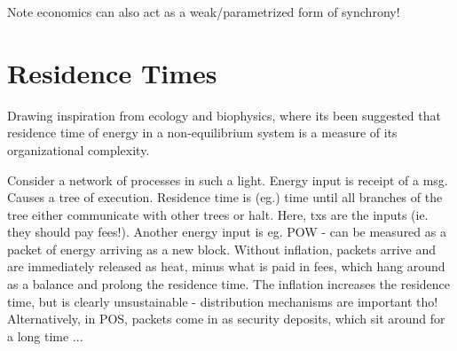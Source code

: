 Note economics can also act as a weak/parametrized form of synchrony!

\section{Residence Times}
Drawing inspiration from ecology and biophysics, 
where its been suggested that residence time of energy in a non-equilibrium system is a 
measure of its organizational complexity.

Consider a network of processes in such a light.
Energy input is receipt of a msg. 
Causes a tree of execution. 
Residence time is (eg.) time until all branches of the tree either communicate with other trees or halt.
Here, txs are the inputs (ie. they should pay fees!).
Another energy input is eg. POW - can be measured as a packet of energy arriving as a new block.
Without inflation, packets arrive and are immediately released as heat, minus what is paid in fees,
which hang around as a balance and prolong the residence time.
The inflation increases the residence time, but is clearly unsustainable - distribution mechanisms are important tho!
Alternatively, in POS, packets come in as security deposits, which sit around for a long time ...
